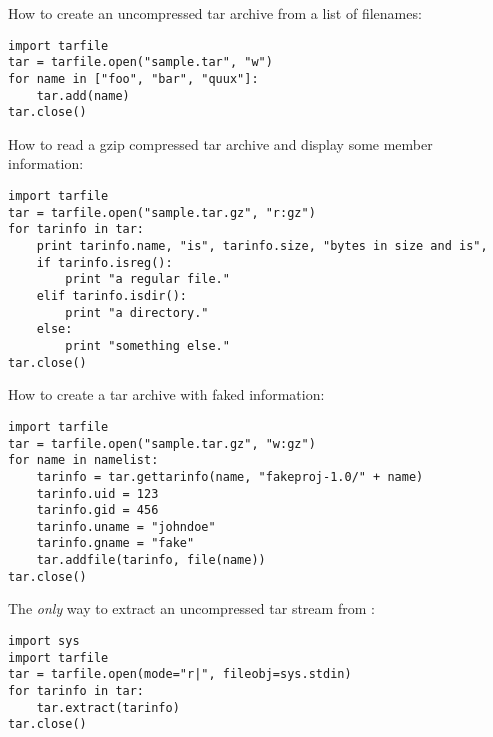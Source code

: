 How to create an uncompressed tar archive from a list of filenames:
\begin{verbatim}
import tarfile
tar = tarfile.open("sample.tar", "w")
for name in ["foo", "bar", "quux"]:
    tar.add(name)
tar.close()
\end{verbatim}

How to read a gzip compressed tar archive and display some member information:
\begin{verbatim}
import tarfile
tar = tarfile.open("sample.tar.gz", "r:gz")
for tarinfo in tar:
    print tarinfo.name, "is", tarinfo.size, "bytes in size and is",
    if tarinfo.isreg():
        print "a regular file."
    elif tarinfo.isdir():
        print "a directory."
    else:
        print "something else."
tar.close()
\end{verbatim}

How to create a tar archive with faked information:
\begin{verbatim}
import tarfile
tar = tarfile.open("sample.tar.gz", "w:gz")
for name in namelist:
    tarinfo = tar.gettarinfo(name, "fakeproj-1.0/" + name)
    tarinfo.uid = 123
    tarinfo.gid = 456
    tarinfo.uname = "johndoe"
    tarinfo.gname = "fake"
    tar.addfile(tarinfo, file(name))
tar.close()
\end{verbatim}

The \emph{only} way to extract an uncompressed tar stream from
:
\begin{verbatim}
import sys
import tarfile
tar = tarfile.open(mode="r|", fileobj=sys.stdin)
for tarinfo in tar:
    tar.extract(tarinfo)
tar.close()
\end{verbatim}
